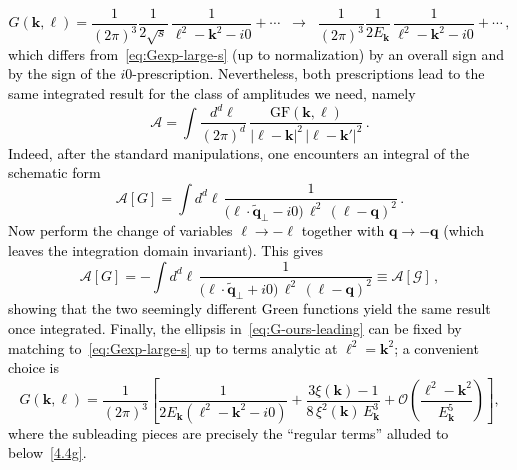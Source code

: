 \textcolor{black}{
\begin{equation}
  G(\boldsymbol{k},\boldsymbol{\ell})
  =\frac{1}{(2\pi)^{3}}\frac{1}{2\sqrt{s}}\,
  \frac{1}{\boldsymbol{\ell}^{2}-\boldsymbol{k}^{2}-i0}+\cdots
  \;\;\longrightarrow\;\;
  \frac{1}{(2\pi)^{3}}\frac{1}{2E_{\boldsymbol{k}}}\,
  \frac{1}{\boldsymbol{\ell}^{2}-\boldsymbol{k}^{2}-i0}+\cdots\, ,
  \label{eq:G-ours-leading}
\end{equation}
which differs from~\eqref{eq:Gexp-large-s} (up to normalization) by an overall sign and by the sign of the
$i0$-prescription. Nevertheless, both prescriptions lead to the same integrated result for the class of
amplitudes we need, namely
\begin{equation}
  \mathcal{A}=\int\!\frac{d^{d}\boldsymbol{\ell}}{(2\pi)^{d}}\,
  \frac{\mathrm{GF}(\boldsymbol{k},\boldsymbol{\ell})}{|\boldsymbol{\ell}-\boldsymbol{k}|^{2}\,|\boldsymbol{\ell}-\boldsymbol{k}'|^{2}}\, .
\end{equation}
Indeed, after the standard manipulations, one encounters an integral of the schematic form
\begin{equation}
  \mathcal{A}[G]=
  \int d^{d}\boldsymbol{\ell}\,
  \frac{1}{\big(\boldsymbol{\ell}\!\cdot\!\tilde{\boldsymbol{q}}_{\perp}-i0\big)\,\boldsymbol{\ell}^{2}\,(\boldsymbol{\ell}-\boldsymbol{q})^{2}}\, .
\end{equation}
Now perform the change of variables $\boldsymbol{\ell}\to-\boldsymbol{\ell}$ together with
$\boldsymbol{q}\to-\boldsymbol{q}$ (which leaves the integration domain invariant). This gives
\begin{equation}
  \mathcal{A}[G]=
  -\int d^{d}\boldsymbol{\ell}\,
  \frac{1}{\big(\boldsymbol{\ell}\!\cdot\!\tilde{\boldsymbol{q}}_{\perp}+i0\big)\,\boldsymbol{\ell}^{2}\,(\boldsymbol{\ell}-\boldsymbol{q})^{2}}
  \equiv \mathcal{A}[\mathcal{G}]\, ,
\end{equation}
showing that the two seemingly different Green functions yield the same result once integrated.
Finally, the ellipsis in~\eqref{eq:G-ours-leading} can be fixed by matching to~\eqref{eq:Gexp-large-s} up to
terms analytic at $\boldsymbol{\ell}^{2}=\boldsymbol{k}^{2}$; a convenient choice is
\begin{equation}
  G(\boldsymbol{k},\boldsymbol{\ell})=\frac{1}{(2\pi)^{3}}
  \left[
    \frac{1}{2E_{\boldsymbol{k}}(\boldsymbol{\ell}^{2}-\boldsymbol{k}^{2}-i0)}
    +\frac{3\xi(\boldsymbol{k})-1}{8\,\xi^2(\boldsymbol{k})\,E_{\boldsymbol{k}}^3}
    +\mathcal{O}\!\left(\frac{\boldsymbol{\ell}^{2}-\boldsymbol{k}^{2}}{E_{\boldsymbol{k}}^{5}}\right)
  \right],
\end{equation}
where the subleading pieces are precisely the ``regular terms'' alluded to below~\eqref{4.4g}.}
